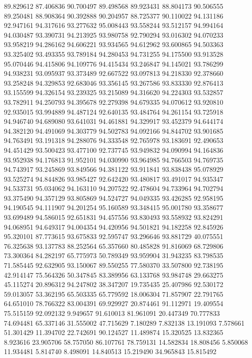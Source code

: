 89.829612
87.406836
90.700497
89.498568
89.923431
88.804173
90.506555
89.250481
88.908364
90.392888
90.204957
88.725377
90.110022
94.131186
92.947161
94.317616
93.277632
95.008443
93.558244
93.512157
94.994164
94.030487
93.390731
94.213925
93.980758
92.790294
93.016302
94.070233
93.958219
94.286162
94.606221
93.934565
94.612962
93.600865
94.503363
93.325402
93.493355
93.789184
94.280453
94.731255
94.175500
93.913528
95.070446
94.415806
94.109776
94.415434
93.246847
94.145021
93.786299
94.938231
93.095937
93.373489
92.667522
93.097813
94.218330
92.378660
93.258248
94.329853
92.683046
93.356145
93.267586
93.833330
92.876413
93.155599
94.326154
93.239325
93.215089
94.316620
94.224303
93.532857
93.782911
94.250793
94.395678
92.279398
94.679335
94.070612
93.920810
92.935015
93.994889
94.487124
92.640135
93.484764
94.261154
93.725918
94.946740
94.689080
93.641031
94.461881
94.329917
93.452379
94.644174
94.382120
94.491069
94.303779
94.502783
94.092166
94.844702
93.901685
94.763491
93.191318
94.288076
94.333548
92.765978
93.183691
92.490653
94.451429
93.500423
93.477100
92.737745
93.949832
94.090994
94.164836
93.952938
94.176813
91.952101
94.030990
93.964985
94.766503
94.769735
94.743917
93.245869
93.849566
94.381122
93.911841
93.838438
95.078929
93.525274
94.844826
93.985427
92.642420
93.480817
93.491017
94.935347
94.533731
95.034062
94.163110
94.207522
92.478604
94.733964
94.702794
93.375490
94.357129
93.805869
94.524727
94.049335
93.426285
92.958195
94.190545
94.111907
94.201254
95.160589
93.348415
95.001780
93.358677
93.699489
94.586015
92.651831
94.457556
93.830493
93.558932
93.824291
94.068951
94.649317
94.004354
94.420956
94.501821
94.182258
92.845926
95.320101
87.773615
93.675833
92.595747
93.296646
93.881729
40.075551
76.325638
93.137783
88.252564
65.357660
80.485828
91.816069
68.729806
73.300364
84.282197
65.775973
50.789349
93.959904
31.943235
83.798535
71.585445
92.632905
93.150067
89.550255
77.580370
33.507800
92.738195
42.914147
75.564326
50.347845
83.389956
63.133768
93.984748
29.663275
45.115274
20.896312
94.247802
38.347207
19.735435
25.407986
92.530172
59.013057
53.362195
65.503335
65.779592
18.006304
71.857907
22.791765
64.651010
78.766322
83.004391
69.929927
20.874461
91.112971
19.409554
75.515159
92.092132
9.949657
91.610013
81.961091
20.447349
70.777833
74.694481
65.337146
31.555002
47.715629
7.180289
7.832138
13.191093
7.578661
51.301429
11.394702
22.742691
90.124527
11.489874
15.320525
13.832365
8.923616
23.905706
58.757050
86.107761
78.759131
14.582834
18.808456
5.850068
11.934481
5.814740
8.498091
14.840513
15.219490
34.965843
15.815492
